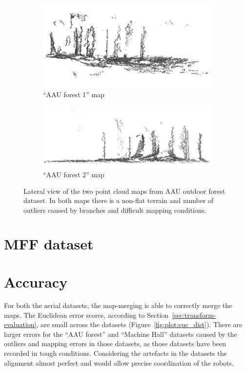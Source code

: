 \begin{figure}
    \centering
    \begin{subfigure}[b]{\textwidth}
        \includegraphics[width=\textwidth]{../img/aau_fc_dnav5_lateral.png}
        \caption{``\gls{AAU} forest 1'' map}
    \end{subfigure}
    \begin{subfigure}[b]{\textwidth}
        \includegraphics[width=\textwidth]{../img/aau_fc_dnav6_lateral.png}
        \caption{``\gls{AAU} forest 2'' map}
    \end{subfigure}
    \caption[Forest point cloud maps -- lateral view]{Lateral view of the two point cloud maps from \gls{AAU} outdoor forest dataset. In both maps there is a non-flat terrain and number of outliers caused by branches and difficult mapping conditions.}
    \label{fig:aau_lateral}
\end{figure}

\section{MFF dataset}
\label{sec:mff-dataset}

\section{Accuracy}

For both the aerial datasets, the map-merging is able to correctly merge the maps. The Euclidean error scores, according to Section~\ref{sec:transform-evaluation}, are small across the datasets (Figure~\ref{fig:plot:euc_dist}). There are larger errors for the ``AAU forest'' and ``Machine Hall'' datasets caused by the outliers and mapping errors in those datasets, as those datasets have been recorded in tough conditions. Considering the artefacts in the datasets the alignment almost perfect and would allow precise coordination of the robots.

